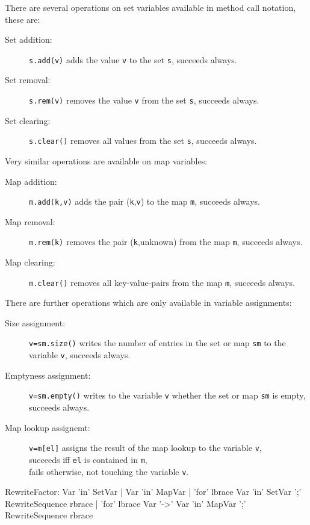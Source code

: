 \noindent There are several operations on set variables available in method call notation, these are:

\begin{description}
\item[Set addition:] \texttt{s.add(v)} adds the value \texttt{v} to the set \texttt{s}, succeeds always.
\item[Set removal:] \texttt{s.rem(v)} removes the value \texttt{v} from the set \texttt{s}, succeeds always.
\item[Set clearing:] \texttt{s.clear()} removes all values from the set \texttt{s}, succeeds always.
\end{description}

\noindent Very similar operations are available on map variables:

\begin{description}
\item[Map addition:] \texttt{m.add(k,v)} adds the pair (\texttt{k},\texttt{v}) to the map \texttt{m}, succeeds always.
\item[Map removal:] \texttt{m.rem(k)} removes the pair (\texttt{k},unknown) from the map \texttt{m}, succeeds always.
\item[Map clearing:] \texttt{m.clear()} removes all key-value-pairs from the map \texttt{m}, succeeds always.
\end{description}

\noindent There are further operations which are only available in variable assignments:

\begin{description}
\item[Size assignment:] \texttt{v=sm.size()} writes the number of entries in the set or map \texttt{sm} to the variable \texttt{v}, succeeds always.
\item[Emptyness assignment:] \texttt{v=sm.empty()} writes to the variable \texttt{v} whether the set or map \texttt{sm} is empty,\\ succeeds always.
\item[Map lookup assignemt:] \texttt{v=m[el]} assigns the result of the map lookup to the variable \texttt{v},\\succeeds iff \texttt{el} is contained in \texttt{m},\\ fails otherwise, not touching the variable \texttt{v}.
\end{description}

\begin{rail}
  RewriteFactor:
    Var 'in' SetVar |
    Var 'in' MapVar |
    'for' lbrace Var 'in' SetVar ';' RewriteSequence rbrace |
    'for' lbrace Var '->' Var 'in' MapVar ';' RewriteSequence rbrace
\end{rail}

